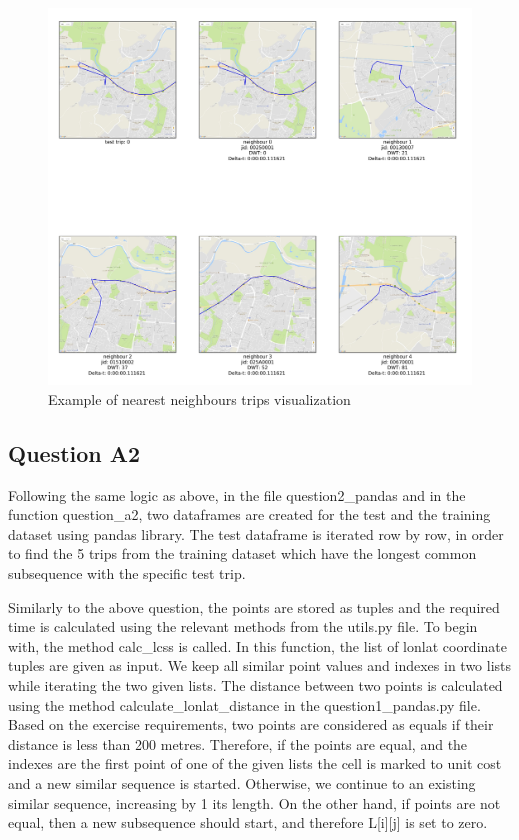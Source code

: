 \documentclass[12pt]{article}
\begin{document}
	\begin{figure} [H]
		\begin{center}
			\includegraphics [scale = 0.50] {question2a1example.jpg}
			\caption{Example of nearest neighbours trips visualization}
		\end{center}
	\end{figure} 
	
	\subsection{Question A2}
	Following the same logic as above, in the file question2\_pandas and in the function question\_a2, two dataframes are created for the test and the training dataset using pandas library. The test dataframe is iterated row by row, in order to find the 5 trips from the training dataset which have the longest common subsequence with the specific test trip.
	
	Similarly to the above question, the points are stored as tuples and the required time is calculated using the relevant methods from the utils.py file. To begin with, the method calc\_lcss is called. In this function, the list of lonlat coordinate tuples are given as input. We keep all similar point values and indexes in two lists while iterating the two given lists. The distance between two points is calculated using the method calculate\_lonlat\_distance in the question1\_pandas.py file. Based on the exercise requirements, two points are considered as equals if their distance is less than 200 metres. Therefore, if the points are equal, and the indexes are the first point of one of the given lists the cell is marked to unit cost and a new similar sequence is started. Otherwise, we continue to an existing similar sequence, increasing by 1 its length.  On the other hand, if points are not equal, then a new subsequence should start, and therefore L[i][j] is set to zero.
	
\end{document}
